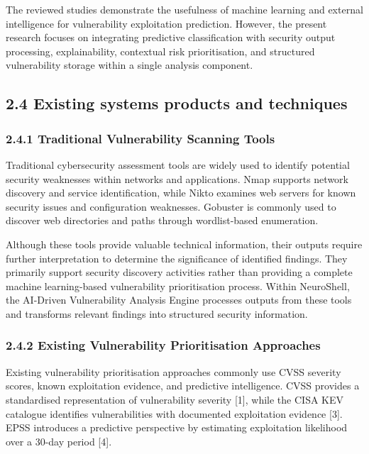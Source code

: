 \documentclass[
]{article}
\begin{document}
The reviewed studies demonstrate the usefulness of machine learning and
external intelligence for vulnerability exploitation prediction.
However, the present research focuses on integrating predictive
classification with security output processing, explainability,
contextual risk prioritisation, and structured vulnerability storage
within a single analysis component.

\hypertarget{existing-systems-products-and-techniques}{%
\subsection{2.4 Existing systems products and
techniques}\label{existing-systems-products-and-techniques}}

\hypertarget{traditional-vulnerability-scanning-tools}{%
\subsubsection{2.4.1 Traditional Vulnerability Scanning
Tools}\label{traditional-vulnerability-scanning-tools}}

Traditional cybersecurity assessment tools are widely used to identify
potential security weaknesses within networks and applications. Nmap
supports network discovery and service identification, while Nikto
examines web servers for known security issues and configuration
weaknesses. Gobuster is commonly used to discover web directories and
paths through wordlist-based enumeration.

Although these tools provide valuable technical information, their
outputs require further interpretation to determine the significance of
identified findings. They primarily support security discovery
activities rather than providing a complete machine learning-based
vulnerability prioritisation process. Within NeuroShell, the AI-Driven
Vulnerability Analysis Engine processes outputs from these tools and
transforms relevant findings into structured security information.

\hypertarget{existing-vulnerability-prioritisation-approaches}{%
\subsubsection{2.4.2 Existing Vulnerability Prioritisation
Approaches}\label{existing-vulnerability-prioritisation-approaches}}

Existing vulnerability prioritisation approaches commonly use CVSS
severity scores, known exploitation evidence, and predictive
intelligence. CVSS provides a standardised representation of
vulnerability severity {[}1{]}, while the CISA KEV catalogue identifies
vulnerabilities with documented exploitation evidence {[}3{]}. EPSS
introduces a predictive perspective by estimating exploitation
likelihood over a 30-day period {[}4{]}.
\end{document}

